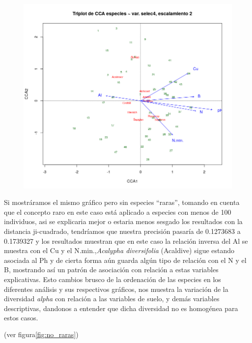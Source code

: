 \documentclass[11pt,]{article}
\begin{document}
\begin{figure}
\centering
\includegraphics{CCA.png}
\caption{\label{fig:CCA}}
\end{figure}

Si mostráramos el mismo gráfico pero sin especies ``raras'', tomando en
cuenta que el concepto raro en este caso está aplicado a especies con
menos de 100 individuos, asi se explicaria mejor o estaria menos sesgado
los resultados con la distancia ji-cuadrado, tendríamos que nuestra
precisión pasaría de 0.1273683 a 0.1739327 y los resultados muestran que
en este caso la relación inversa del Al se muestra con el Cu y el
N.min.,\emph{Acalypha diversifolia} (Acaldive) sigue estando asociada al
Ph y de cierta forma aún guarda algún tipo de relación con el N y el B,
mostrando así un patrón de asociación con relación a estas variables
explicativas. Esto cambios brusco de la ordenación de las especies en
los diferentes análisis y sus respectivos gráficos, nos muestra la
variación de la diversidad \emph{alpha} con relación a las variables de
suelo, y demás variables descriptivas, dandonos a entender que dicha
diversidad no es homogénea para estos casos.

(ver figura\ref{fig:no_raras})
\end{document}

